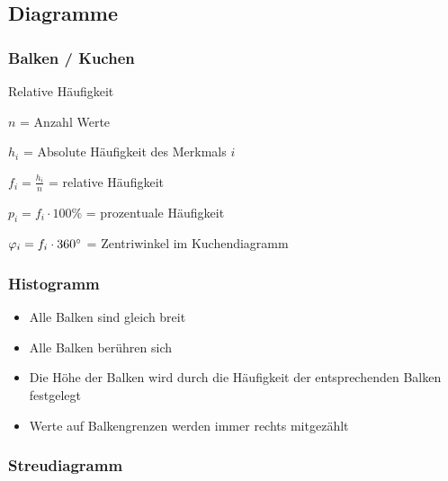 \begin{multicols}{2}
\subsection*{Diagramme}
\subsubsection*{Balken / Kuchen}
\begin{definition*}{Relative Häufigkeit}{}

$n$ = Anzahl Werte

$h_i$ = Absolute Häufigkeit des Merkmals $i$

$f_i = \frac{h_i}n$ = relative Häufigkeit

$p_i = f_i\cdot{}100\%$ = prozentuale Häufigkeit

$\varphi_i = f_i\cdot{}360^\circ$ = Zentriwinkel im Kuchendiagramm
\end{definition*}



\subsubsection*{Histogramm}
\begin{itemize}
\item Alle Balken sind gleich breit
\item Alle Balken berühren sich
\item Die Höhe der Balken wird durch die Häufigkeit der entsprechenden
Balken festgelegt
\item Werte auf Balkengrenzen werden immer rechts mitgezählt
\end{itemize}

\subsubsection*{Streudiagramm}



\end{multicols}
